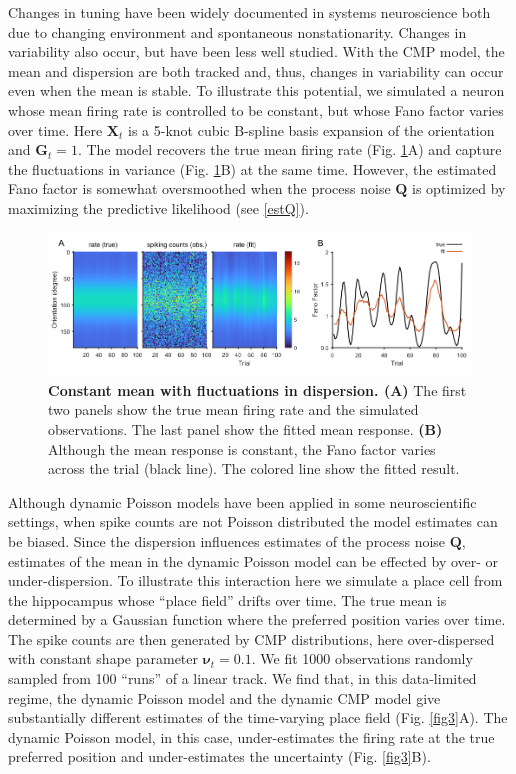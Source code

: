 \documentclass[]{article}
\begin{document}
	Changes in tuning have been widely documented in systems neuroscience both due to changing environment and spontaneous nonstationarity. Changes in variability also occur, but have been less well studied. With the CMP model, the mean and dispersion are both tracked and, thus, changes in variability can occur even when the mean is stable. To illustrate this potential, we simulated a neuron whose mean firing rate is controlled to be constant, but whose Fano factor varies over time. Here $\bm{X}_t$ is a 5-knot cubic B-spline basis expansion of the orientation and $\bm{G}_t = 1$. The model recovers the true mean firing rate (Fig. \ref{fig2}A) and capture the fluctuations in variance (Fig. \ref{fig2}B) at the same time. However, the estimated Fano factor is somewhat oversmoothed when the process noise $\bm{Q}$ is optimized by maximizing the predictive likelihood (see \ref{estQ}).
	
	\begin{figure}[h!]
		\centering
		\includegraphics[width=1\textwidth]{figure2.png}
		\caption{\textbf{Constant mean with fluctuations in dispersion. (A)} The first two panels show the true mean firing rate and the simulated observations. The last panel show the fitted mean response. \textbf{(B)} Although the mean response is constant, the Fano factor varies across the trial (black line). The colored line show the fitted result.}
		\label{fig2}
	\end{figure}
	
	Although dynamic Poisson models have been applied in some neuroscientific settings, when spike counts are not Poisson distributed the model estimates can be biased. Since the dispersion influences estimates of the process noise $\bm{Q}$, estimates of the mean in the dynamic Poisson model can be effected by over- or under-dispersion. To illustrate this interaction here we simulate a place cell from the hippocampus whose “place field” drifts over time. The true mean is determined by a Gaussian function where the preferred position varies over time. The spike counts are then generated by CMP distributions, here over-dispersed with constant shape parameter $\bm{\nu}_t = 0.1$. We fit 1000 observations randomly sampled from 100 “runs” of a linear track. We find that, in this data-limited regime, the dynamic Poisson model and the dynamic CMP model give substantially different estimates of the time-varying place field (Fig. \ref{fig3}A). The dynamic Poisson model, in this case, under-estimates the firing rate at the true preferred position and under-estimates the uncertainty (Fig. \ref{fig3}B). 
	
\end{document}
